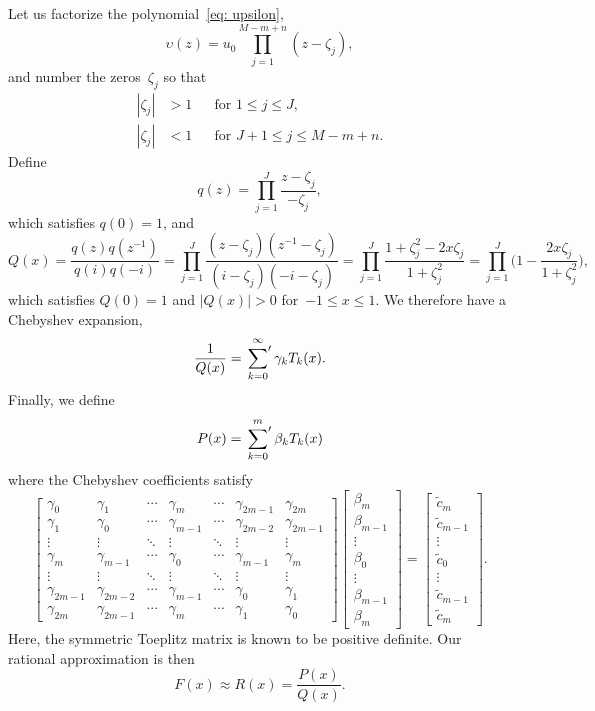 \documentclass[12pt,a4paper]{article}
\begin{document}
Let us factorize the polynomial~\eqref{eq: upsilon},
\[
\upsilon(z)=u_0\prod_{j=1}^{M-m+n}(z-\zeta_j),
\]
and number the zeros~$\zeta_j$ so that
\[
\begin{aligned}
|\zeta_j|&>1&&\text{for $1\le j\le J$,}\\
|\zeta_j|&<1&&\text{for $J+1\le j\le M-m+n$.}
\end{aligned}
\]
Define
\[
q(z)=\prod_{j=1}^J\frac{z-\zeta_j}{-\zeta_j},
\]
which satisfies $q(0)=1$, and
\[
Q(x)=\frac{q(z)q(z^{-1})}{q(i)q(-i)}
    =\prod_{j=1}^J\frac{(z-\zeta_j)(z^{-1}-\zeta_j)}{(i-\zeta_j)(-i-\zeta_j)}
    =\prod_{j=1}^J\frac{1+\zeta_j^2-2x\zeta_j}{1+\zeta_j^2}
    =\prod_{j=1}^J\biggl(1-\frac{2x\zeta_j}{1+\zeta_j^2}\biggr),
\]
which satisfies $Q(0)=1$ and $|Q(x)|>0$ for~$-1\le x\le 1$.  We therefore have 
a Chebyshev expansion,
\[
\frac{1}{Q(x)}=\sideset{}{'}\sum_{k=0}^\infty\gamma_kT_k(x).
\]
Finally, we define
\[
P(x)=\sideset{}{'}\sum_{k=0}^m\beta_kT_k(x)
\]
where the Chebyshev coefficients satisfy
\[
\begin{bmatrix}
\gamma_0     &\gamma_1&\cdots&\gamma_m    &\cdots&\gamma_{2m-1}&\gamma_{2m}\\
\gamma_1     &\gamma_0&\cdots&\gamma_{m-1}&\cdots&\gamma_{2m-2}&\gamma_{2m-1}\\
\vdots       &\vdots  &\ddots&\vdots      &\ddots&\vdots       &\vdots\\
\gamma_m     &\gamma_{m-1}&\cdots&\gamma_0&\cdots&\gamma_{m-1} &\gamma_m\\
\vdots       &\vdots  &\ddots&\vdots      &\ddots&\vdots       &\vdots\\
\gamma_{2m-1}&\gamma_{2m-2}&\cdots&\gamma_{m-1}&\cdots&\gamma_0&\gamma_1\\
\gamma_{2m}  &\gamma_{2m-1}&\cdots&\gamma_m&\cdots&\gamma_1&\gamma_0
\end{bmatrix}
\begin{bmatrix}\beta_m\\ \beta_{m-1}\\ \vdots\\ \beta_0\\ \vdots\\ 
\beta_{m-1}\\ \beta_m
\end{bmatrix}
=\begin{bmatrix}\tilde c_m\\ \tilde c_{m-1}\\ \vdots\\ \tilde c_0\\ \vdots\\
\tilde c_{m-1}\\ \tilde c_m
 \end{bmatrix}.
\]
Here, the symmetric Toeplitz matrix is known to be positive definite.  Our 
rational approximation is then
\[
F(x)\approx R(x)=\frac{P(x)}{Q(x)}.
\]
\end{document}
